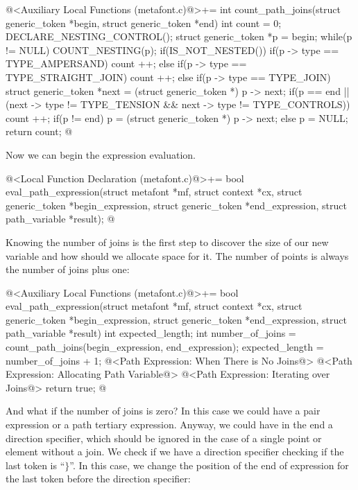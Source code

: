\iniciocodigo
@<Auxiliary Local Functions (metafont.c)@>+=
int count_path_joins(struct generic_token *begin, struct generic_token *end){
int count = 0;
  DECLARE_NESTING_CONTROL();
  struct generic_token *p = begin;
  while(p != NULL){
    COUNT_NESTING(p);
    if(IS_NOT_NESTED()){
      if(p -> type == TYPE_AMPERSAND)
        count ++;
      else if(p -> type == TYPE_STRAIGHT_JOIN)
        count ++;
      else if(p -> type == TYPE_JOIN){
        struct generic_token *next = (struct generic_token *) p -> next;
        if(p == end || (next -> type !=  TYPE_TENSION &&
                        next -> type != TYPE_CONTROLS))
          count ++;
      }
    }
    if(p != end)
      p = (struct generic_token *) p -> next;
    else
      p = NULL;
  }
  return count;
}
@
\fimcodigo

Now we can begin the expression evaluation.

\iniciocodigo
@<Local Function Declaration (metafont.c)@>+=
bool eval_path_expression(struct metafont *mf, struct context *cx,
                          struct generic_token *begin_expression,
                          struct generic_token *end_expression,
                          struct path_variable *result);
@
\fimcodigo

Knowing the number of joins is the first step to discover the size of
our new variable and how should we allocate space for it. The number
of points is always the number of joins plus one:

\iniciocodigo
@<Auxiliary Local Functions (metafont.c)@>+=
bool eval_path_expression(struct metafont *mf, struct context *cx,
                          struct generic_token *begin_expression,
                          struct generic_token *end_expression,
                          struct path_variable *result){
  int expected_length;
  int number_of_joins = count_path_joins(begin_expression, end_expression);
  expected_length = number_of_joins + 1;
  @<Path Expression: When There is No Joins@>
  @<Path Expression: Allocating Path Variable@>
  @<Path Expression: Iterating over Joins@>
  return true;
}
@
\fimcodigo

And what if the number of joins is zero? In this case we could have a
pair expression or a path tertiary expression. Anyway, we could have
in the end a direction specifier, which should be ignored in the case
of a single point or element without a join. We check if we have a
direction specifier checking if the last token is ``$\}$''. In this case,
we change the position of the end of expression for the last token
before the direction specifier:

